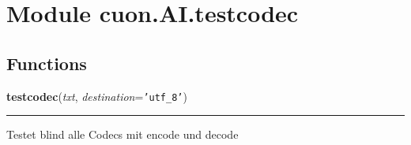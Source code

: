 %
%
%


\section{Module cuon.AI.testcodec}

    \label{cuon:AI:testcodec}


  \subsection{Functions}

    \label{cuon:AI:testcodec:testcodec}

    \vspace{0.5ex}

\hspace{.8\funcindent}\begin{boxedminipage}{\funcwidth}

    \raggedright \textbf{testcodec}(\textit{txt}, \textit{destination}={\tt \texttt{'}\texttt{utf\_8}\texttt{'}})

    \vspace{-1.5ex}

    \rule{\textwidth}{0.5\fboxrule}
\setlength{\parskip}{2ex}
    Testet blind alle Codecs mit encode und decode

\setlength{\parskip}{1ex}
    \end{boxedminipage}



